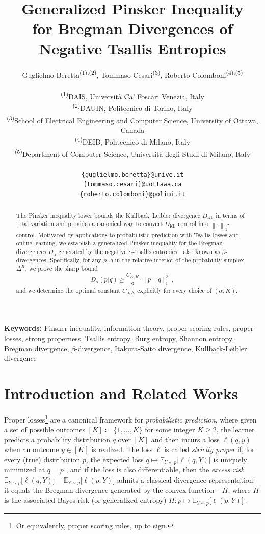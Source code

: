 \documentclass[11pt,oneside,a4paper]{article}
\title{Generalized Pinsker Inequality \\for Bregman Divergences of Negative Tsallis Entropies}
\author{
    Guglielmo Beretta\textsuperscript{\rm (1),(2)},
    Tommaso Cesari\textsuperscript{\rm (3)},
    Roberto Colomboni\textsuperscript{\rm (4),(5)}
    \\\\
\textnormal{\textsuperscript{\rm (1)}DAIS, Universit\`{a} Ca' Foscari Venezia, Italy}\\
\textnormal{\textsuperscript{\rm (2)}DAUIN, Politecnico di Torino, Italy}\\
\textnormal{\textsuperscript{\rm (3)}School of Electrical Engineering and Computer Science, University of Ottawa, Canada}\\
\textnormal{\textsuperscript{\rm (4)}DEIB, Politecnico di Milano, Italy}\\
\textnormal{\textsuperscript{\rm (5)}Department of Computer Science, Università degli Studi di Milano, Italy}\\\\
\textnormal{\texttt{\{guglielmo.beretta\}@unive.it}}\\
\textnormal{\texttt{\{tommaso.cesari\}@uottawa.ca}}\\
\textnormal{\texttt{\{roberto.colomboni\}@polimi.it}}\\
}
\newcommand{\E}{\mathbb{E}}
\newcommand{\bsb}[1]{\bigl[#1\bigr]}
\newcommand{\lno}[1]{\left\lVert#1\right\rVert}
\theoremstyle{plain}
\theoremstyle{definition}
\theoremstyle{remark}
\newcommand{\simplex}[1]{\Delta^{#1}}
\newcommand{\KL}{D_{\mathrm{KL}}}
\renewcommand{\thefootnote}{\fnsymbol{footnote}}
\begin{document}
\maketitle
\begin{abstract}
The Pinsker inequality lower bounds the Kullback--Leibler divergence $\KL$ in terms of total variation and provides a canonical way to convert $\KL$ control into $\lno{\cdot}_1$-control.
Motivated by applications to probabilistic prediction with Tsallis losses and online learning, we establish a generalized Pinsker inequality for the Bregman divergences $D_\alpha$ generated by the negative $\alpha$-Tsallis entropies---also known as $\beta$-divergences.
Specifically, for any $p$, $q$ in the relative interior of the probability simplex $\simplex{K}$, we prove the sharp bound
\[
    D_\alpha(p\Vert q) \ge \frac{C_{\alpha,K}}{2}\cdot \|p-q\|_1^2 \;,
\]
and we determine the optimal constant $C_{\alpha,K}$ explicitly for every choice of $(\alpha,K)$.
\end{abstract}
\textbf{Keywords:} {Pinsker inequality, information theory, proper scoring rules, proper losses, strong properness, Tsallis entropy, Burg entropy, Shannon entropy,  Bregman divergence, $\beta$-divergence, Itakura-Saito divergence, Kullback-Leibler divergence}
\renewcommand*{\thefootnote}{\arabic{footnote}}
\setcounter{footnote}{0}
\section{Introduction and Related Works}
Proper losses\footnote{Or equivalently, proper scoring rules, up to sign.} are a canonical framework for \emph{probabilistic prediction}, where 
given a set of possible outcomes $[K] \coloneqq \{1,\dots,K\}$ for some integer $K \ge 2$, the learner predicts a probability distribution $q$ over $[K]$ and then incurs a loss $\ell(q,y)$ when an outcome $y\in[K]$ is realized.
 The loss $\ell$ is called \emph{strictly proper} if, for every (true) distribution $p$, the expected loss $q \mapsto \E_{Y\sim p} \bsb{ \ell(q,Y) }$ is uniquely minimized at $q=p$ \citep{gneiting-raftery2007jasa}, and  
if the loss is also differentiable, then 
 the \emph{excess risk}
$
    \E_{Y\sim p} \bsb{ \ell(q,Y) }-\E_{Y\sim p}\bsb{ \ell(p,Y) }
$
admits a classical divergence representation: it equals the Bregman divergence generated by the convex function $-H$, where $H$ is the associated Bayes risk (or generalized entropy)
$
    H \colon p \mapsto  \E_{Y\sim p} \bsb{ \ell(p,Y)}
$
\citep{reid2009surrogate,abernethy12}.
\end{document}
